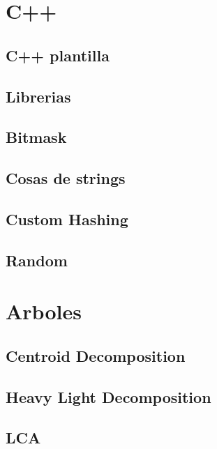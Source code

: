 \section{C++}
\subsection{C++ plantilla}
\raggedbottom
\hrulefill
\subsection{Librerias}
\raggedbottom
\hrulefill
\subsection{Bitmask}
\raggedbottom
\hrulefill
\subsection{Cosas de strings}
\raggedbottom
\hrulefill
\subsection{Custom Hashing}
\raggedbottom
\hrulefill
\subsection{Random}
\raggedbottom
\hrulefill

\section{Arboles}
\subsection{Centroid Decomposition}
\raggedbottom
\hrulefill
\subsection{Heavy Light Decomposition}
\raggedbottom
\hrulefill
\subsection{LCA}
\raggedbottom
\hrulefill
